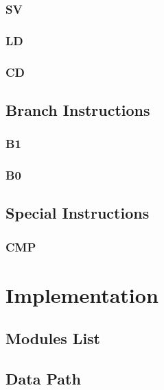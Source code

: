 \documentclass[11pt]{book}
\begin{document}
    \subsection{SV}
    \subsection{LD}
    \subsection{CD}

    \section{Branch Instructions}
    \subsection{B1}
    \subsection{B0}

    \section{Special Instructions}
    \subsection{CMP}



    \chapter{Implementation}
    \label{chapter:implementation}
    \section{Modules List}
    \section{Data Path}
\end{document}
